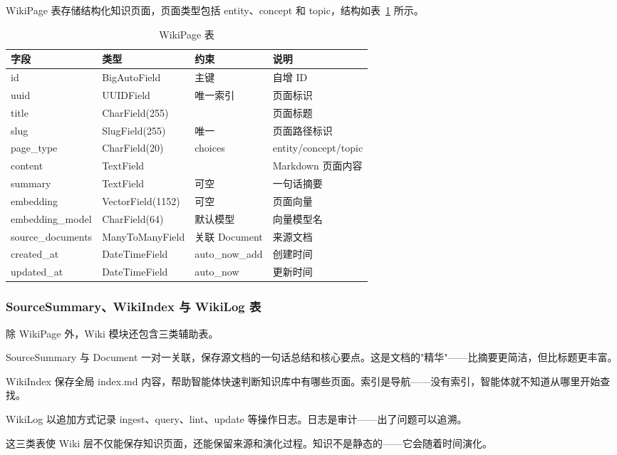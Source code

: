 WikiPage 表存储结构化知识页面，页面类型包括 entity、concept 和 topic，结构如表~\ref{T.wiki_page} 所示。

\begin{table}[htb]
  \centering
  \caption{WikiPage 表}
  \label{T.wiki_page}
  \begin{tabular}{llll}
    \hline
    字段 & 类型 & 约束 & 说明 \\
    \hline
    id & BigAutoField & 主键 & 自增 ID \\
    uuid & UUIDField & 唯一索引 & 页面标识 \\
    title & CharField(255) & & 页面标题 \\
    slug & SlugField(255) & 唯一 & 页面路径标识 \\
    page\_type & CharField(20) & choices & entity/concept/topic \\
    content & TextField & & Markdown 页面内容 \\
    summary & TextField & 可空 & 一句话摘要 \\
    embedding & VectorField(1152) & 可空 & 页面向量 \\
    embedding\_model & CharField(64) & 默认模型 & 向量模型名 \\
    source\_documents & ManyToManyField & 关联 Document & 来源文档 \\
    created\_at & DateTimeField & auto\_now\_add & 创建时间 \\
    updated\_at & DateTimeField & auto\_now & 更新时间 \\
    \hline
  \end{tabular}
\end{table}

\subsubsection{SourceSummary、WikiIndex 与 WikiLog 表}

除 WikiPage 外，Wiki 模块还包含三类辅助表。

SourceSummary 与 Document 一对一关联，保存源文档的一句话总结和核心要点。这是文档的"精华"——比摘要更简洁，但比标题更丰富。

WikiIndex 保存全局 index.md 内容，帮助智能体快速判断知识库中有哪些页面。索引是导航——没有索引，智能体就不知道从哪里开始查找。

WikiLog 以追加方式记录 ingest、query、lint、update 等操作日志。日志是审计——出了问题可以追溯。

这三类表使 Wiki 层不仅能保存知识页面，还能保留来源和演化过程。知识不是静态的——它会随着时间演化。


